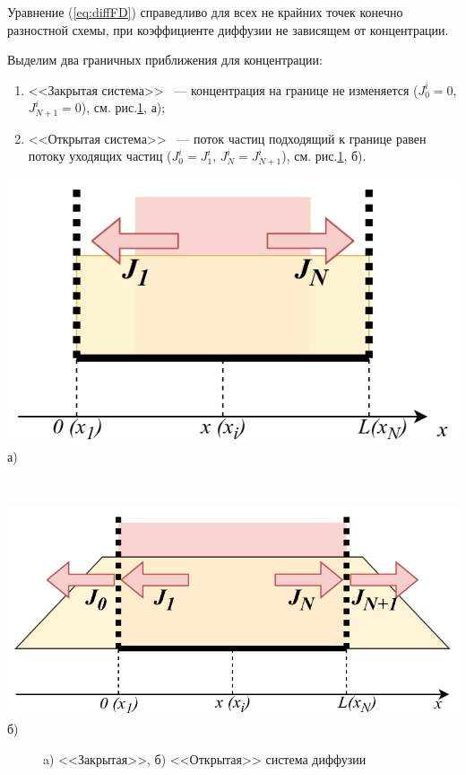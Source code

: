 Уравнение (\ref{eq:diffFD}) справедливо для всех не крайних точек конечно разностной схемы, при коэффициенте диффузии не зависящем от концентрации.

Выделим два граничных приближения для концентрации:
\begin{enumerate}
	\item <<Закрытая система>> ~--- концентрация на границе не изменяется ($J_{0}^{i} = 0$, $J_{N+1}^{i} = 0$), см. рис.\ref{fig:DS}, а);
	\item <<Открытая система>> ~--- поток частиц подходящий к границе равен потоку уходящих частиц ($J_{0}^{i} = J_{1}^{i}$, $J_{N}^{i} = J_{N+1}^{i}$), см. рис.\ref{fig:DS}, б).
\end{enumerate}

\noindent
\begin{minipage}{0.4\textwidth}
	\centering
	\includegraphics[width=\linewidth]{assets/CD}
	а)
\end{minipage}
~
\begin{minipage}{0.6\textwidth}
	\centering
	\includegraphics[width=\linewidth]{assets/OD}
	б)
\end{minipage}
\begin{figure}
	\centering
	\caption{a) <<Закрытая>>, б) <<Открытая>> система диффузии}
	\label{fig:DS}
\end{figure}

